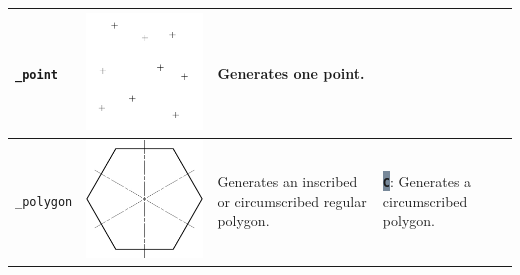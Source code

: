 \documentclass[..]{../IEEEphot}
\newcommand{\param}[1]{\colorbox{LightSlateGray}{\color{Navy}\texttt{\textbf{#1}}}}
\begin{document}
\begin{center}
\begin{longtable}{m{.1\linewidth}m{.2\linewidth}m{.3\linewidth}m{.3\linewidth}}
\texttt{\_point} & \includegraphics[width = 0.8\linewidth, keepaspectratio]{../images/jpg/_point.jpg} & Generates one point. &  \\	
\midrule
\texttt{\_polygon} & \includegraphics[width = 0.8\linewidth, keepaspectratio]{../images/jpg/_polygon.jpg} & Generates an inscribed or circumscribed regular polygon. & 
\param{C}: Generates a circumscribed polygon.


\end{longtable}
\end{center}
\end{document}

